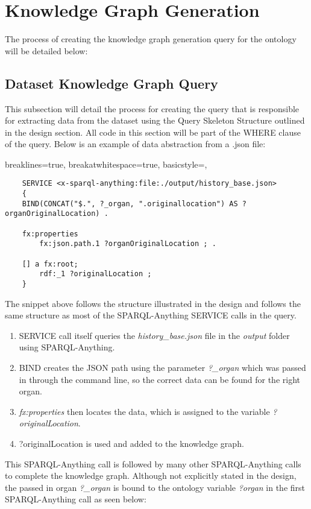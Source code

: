 \section{Knowledge Graph Generation}
\hspace*{0.5cm} The process of creating the knowledge graph generation query for the ontology will be detailed below:

\subsection{Dataset Knowledge Graph Query}
\hspace*{0.5cm} This subsection will detail the process for creating the query that is responsible for extracting data from the dataset using the Query Skeleton Structure outlined in the design section. All code in this section will be part of the WHERE clause of the query. Below is an example of data abstraction from a .json file:

\lstset
{
    breaklines=true,
    breakatwhitespace=true,
    basicstyle=\ttfamily,
}
\begin{lstlisting}
    SERVICE <x-sparql-anything:file:./output/history_base.json> 
    {
    BIND(CONCAT("$.", ?_organ, ".originallocation") AS ?organOriginalLocation) .

    fx:properties
        fx:json.path.1 ?organOriginalLocation ; .

    [] a fx:root; 
        rdf:_1 ?originalLocation ;
    } 
\end{lstlisting}

The snippet above follows the structure illustrated in the design and follows the same structure as most of the SPARQL-Anything SERVICE calls in the query. 
\begin{enumerate}
    \item SERVICE call itself queries the \textit{history\_base.json} file in the \textit{output} folder using SPARQL-Anything. 
    \item BIND creates the JSON path using the parameter \textit{?\_organ} which was passed in through the command line, so the correct data can be found for the right organ. 
    \item \textit{fx:properties} then locates the data, which is assigned to the variable \textit{?originalLocation}. 
    \item ?originalLocation is used and added to the knowledge graph.
\end{enumerate}

This SPARQL-Anything call is followed by many other SPARQL-Anything calls to complete the knowledge graph. Although not explicitly stated in the design, the passed in organ \textit{?\_organ} is bound to the ontology variable \textit{?organ} in the first SPARQL-Anything call as seen below:

